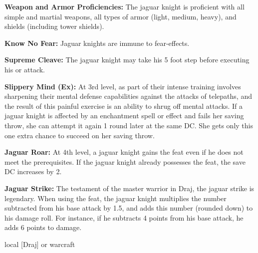 {
\textbf{Weapon and Armor Proficiencies:} The jaguar knight is proficient with all simple and martial weapons, all types of armor (light, medium, heavy), and shields (including tower shields).

\textbf{Know No Fear:} Jaguar knights are immune to fear-effects.

\textbf{Supreme Cleave:} The jaguar knight may take his 5 foot step before executing his  or  attack.

\textbf{Slippery Mind (Ex):} At 3rd level, as part of their intense training involves sharpening their mental defense capabilities against the attacks of telepaths, and the result of this painful exercise is an ability to shrug off mental attacks. If a jaguar knight is affected by an enchantment spell or effect and fails her saving throw, she can attempt it again 1 round later at the same DC. She gets only this one extra chance to succeed on her saving throw.

\textbf{Jaguar Roar:} At 4th level, a jaguar knight gains the  feat even if he does not meet the prerequisites. If the jaguar knight already possesses the  feat, the save DC increases by 2.

\textbf{Jaguar Strike:} The testament of the master warrior in Draj, the jaguar strike is legendary. When using the  feat, the jaguar knight multiplies the number subtracted from his base attack by 1.5, and adds this number (rounded down) to his damage roll. For instance, if he subtracts 4 points from his base attack, he adds 6 points to damage.
}
{}
{local [Draj] or warcraft}
{}
{}
{}